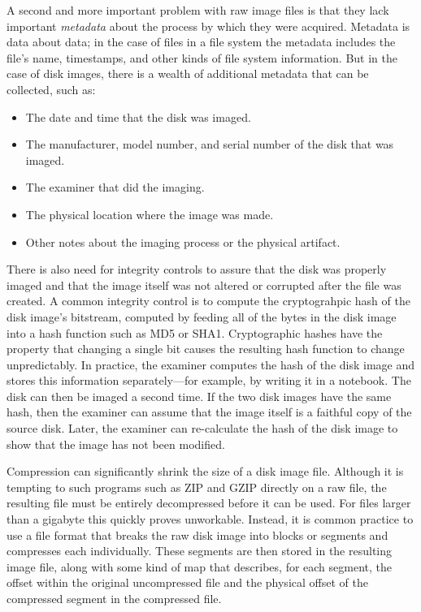 A second and more important problem with raw image files is that they
lack important \emph{metadata} about the process by which they were
acquired. Metadata is data about data; in the case of files in a file
system the metadata includes the file's name, timestamps, and other
kinds of file system information. But in the case of disk images,
there is a wealth of additional metadata that can be collected, such
as:

\begin{itemize}
\item The date and time that the disk was imaged.
\item The manufacturer, model number, and serial number of the disk
  that was imaged.
\item The examiner that did the imaging.
\item The physical location where the image was made.
\item Other notes about the imaging process or the physical artifact.
\end{itemize}

There is also need for integrity controls to assure that the disk was
properly imaged and that the image itself was not altered or corrupted
after the file was created. A common integrity control is to compute
the cryptograhpic hash of the disk image's bitstream, computed by
feeding all of the bytes in the disk image into a hash function such
as MD5 or SHA1. Cryptographic hashes have the property that changing a
single bit causes the resulting hash function to change
unpredictably. In practice, the examiner computes the hash of the disk
image and stores this information separately---for example, by writing
it in a notebook. The disk can then be imaged a second time. If the
two disk images have the same hash, then the examiner can assume that
the image itself is a faithful copy of the source disk. Later, the
examiner can re-calculate the hash of the disk image to show that the
image has not been modified.

Compression can significantly shrink the size of a disk image
file. Although it is tempting to such programs such as ZIP and GZIP
directly on a raw file, the resulting file must be entirely
decompressed before it can be used. For files larger than a gigabyte
this quickly proves unworkable. Instead, it is common practice to
use a file format that breaks the raw disk image into blocks or
segments and compresses each individually. These segments are then
stored in the resulting image file, along with some kind of map that
describes, for each segment, the offset within the original uncompressed file
and the physical offset of the compressed segment in the compressed file.

